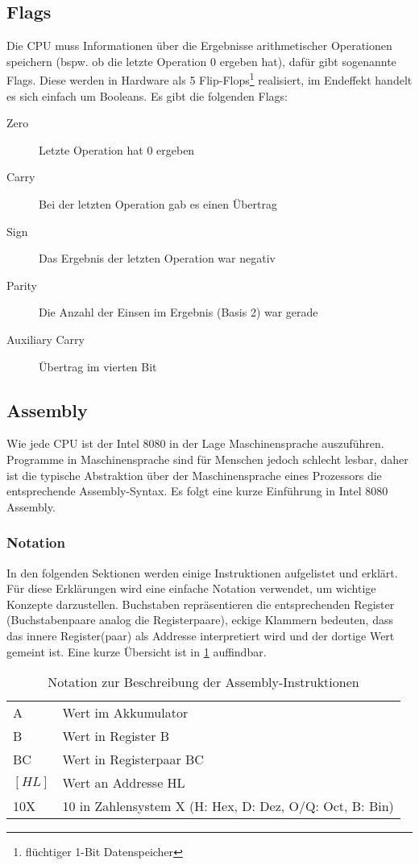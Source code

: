 \subsection{Flags}\label{sec:flags}

Die CPU muss Informationen über die Ergebnisse arithmetischer Operationen speichern (bspw. ob die letzte Operation 0 ergeben hat), dafür gibt sogenannte Flags. Diese werden in Hardware als 5 Flip-Flops\footnote{flüchtiger 1-Bit Datenspeicher} realisiert, im Endeffekt handelt es sich einfach um Booleans. Es gibt die folgenden Flags:

\begin{description}
    \item[Zero] Letzte Operation hat 0 ergeben
    \item[Carry] Bei der letzten Operation gab es einen Übertrag
    \item[Sign] Das Ergebnis der letzten Operation war negativ
    \item[Parity] Die Anzahl der Einsen im Ergebnis (Basis 2) war gerade
    \item[Auxiliary Carry] Übertrag im vierten Bit %
\end{description}


\subsection{Assembly}

Wie jede CPU ist der Intel 8080 in der Lage Maschinensprache auszuführen. Programme in Maschinensprache sind für Menschen jedoch schlecht lesbar, daher ist die typische Abstraktion über der Maschinensprache eines Prozessors die entsprechende Assembly-Syntax.
Es folgt eine kurze Einführung in Intel 8080 Assembly.

\subsubsection{Notation}

In den folgenden Sektionen werden einige Instruktionen aufgelistet und erklärt. Für diese Erklärungen wird eine einfache Notation verwendet, um wichtige Konzepte darzustellen. Buchstaben repräsentieren die entsprechenden Register (Buchstabenpaare analog die Registerpaare), eckige Klammern bedeuten, dass das innere Register(paar) als Addresse interpretiert wird und der dortige Wert gemeint ist.
Eine kurze Übersicht ist in \cref{tab:notation} auffindbar.

\begin{table}[h]
    \centering
    \caption{Notation zur Beschreibung der Assembly-Instruktionen}
    \label{tab:notation}
    \begin{tabular}{l | l}
        A & Wert im Akkumulator\\
        B & Wert in Register B\\
        BC & Wert in Registerpaar BC\\
        $[HL]$ & Wert an Addresse HL\\
        10X & 10 in Zahlensystem X (H: Hex, D: Dez, O/Q: Oct, B: Bin)
    \end{tabular}
\end{table}

